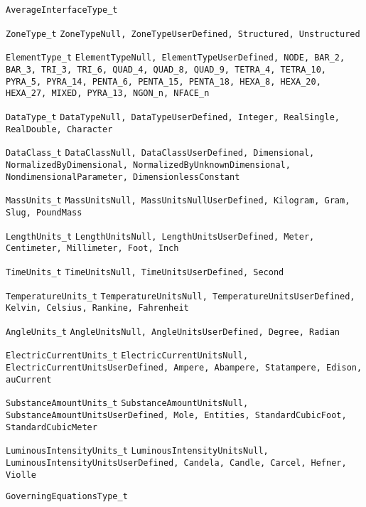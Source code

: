 {\raggedright
\begin{Ventryi}{\texttt{AverageInterfaceType\_t}}
   \item [\texttt{ZoneType\_t}]
         \texttt{ZoneTypeNull, ZoneTypeUserDefined, Structured, Unstructured}
   \item [\texttt{ElementType\_t}]
         \texttt{ElementTypeNull, ElementTypeUserDefined, NODE, BAR\_2, BAR\_3, TRI\_3, TRI\_6, QUAD\_4,
         QUAD\_8, QUAD\_9, TETRA\_4, TETRA\_10, PYRA\_5,
         PYRA\_14, PENTA\_6, PENTA\_15, PENTA\_18, HEXA\_8,
         HEXA\_20, HEXA\_27, MIXED, PYRA\_13, NGON\_n, NFACE\_n}
   \item [\texttt{DataType\_t}]
         \texttt{DataTypeNull, DataTypeUserDefined, Integer, RealSingle, RealDouble, Character}
   \item [\texttt{DataClass\_t}]
         \texttt{DataClassNull, DataClassUserDefined, Dimensional, NormalizedByDimensional,
         NormalizedByUnknownDimensional, NondimensionalParameter,
         DimensionlessConstant}
   \item [\texttt{MassUnits\_t}]
         \texttt{MassUnitsNull, MassUnitsNullUserDefined, Kilogram, Gram, Slug, PoundMass}
   \item [\texttt{LengthUnits\_t}]
         \texttt{LengthUnitsNull, LengthUnitsUserDefined, Meter, Centimeter, Millimeter, Foot,
         Inch}
   \item [\texttt{TimeUnits\_t}]
         \texttt{TimeUnitsNull, TimeUnitsUserDefined, Second}
   \item [\texttt{TemperatureUnits\_t}]
         \texttt{TemperatureUnitsNull, TemperatureUnitsUserDefined, Kelvin, Celsius, Rankine,
         Fahrenheit}
   \item [\texttt{AngleUnits\_t}]
         \texttt{AngleUnitsNull, AngleUnitsUserDefined, Degree, Radian}
   \item [\texttt{ElectricCurrentUnits\_t}]
         \texttt{ElectricCurrentUnitsNull, ElectricCurrentUnitsUserDefined, Ampere, Abampere, Statampere, Edison,
         auCurrent}
   \item [\texttt{SubstanceAmountUnits\_t}]
         \texttt{SubstanceAmountUnitsNull, SubstanceAmountUnitsUserDefined, Mole, Entities, StandardCubicFoot,
         StandardCubicMeter}
   \item [\texttt{LuminousIntensityUnits\_t}]
         \texttt{LuminousIntensityUnitsNull, LuminousIntensityUnitsUserDefined, Candela, Candle, Carcel, Hefner, Violle}
   \item [\texttt{GoverningEquationsType\_t}]

\end{Ventryi}}
